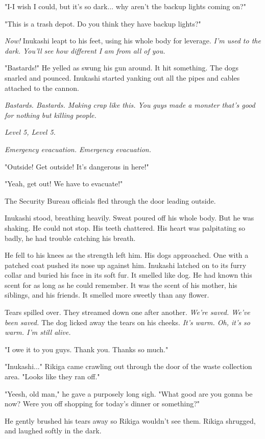 "I-I wish I could, but it's so dark... why aren't the backup lights
coming on?"

"This is a trash depot. Do you think they have backup lights?"

\emph{Now!} Inukashi leapt to his feet, using his whole body for leverage. \emph{I'm
used to the dark. You'll see how different I am from all of you.}

"Bastards!" He yelled as swung his gun around. It hit something. The
dogs snarled and pounced. Inukashi started yanking out all the pipes and
cables attached to the cannon.

\emph{Bastards. Bastards. Making crap like this. You guys made a monster
that's good for nothing but killing people.}

\emph{Level 5, Level 5.}

\emph{Emergency evacuation. Emergency evacuation.}

"Outside! Get outside! It's dangerous in here!"

"Yeah, get out! We have to evacuate!"

The Security Bureau officials fled through the door leading outside.

Inukashi stood, breathing heavily. Sweat poured off his whole body. But
he was shaking. He could not stop. His teeth chattered. His heart was
palpitating so badly, he had trouble catching his breath.

He fell to his knees as the strength left him. His dogs approached. One
with a patched coat pushed its nose up against him. Inukashi latched on
to its furry collar and buried his face in its soft fur. It smelled like
dog. He had known this scent for as long as he could remember. It was
the scent of his mother, his siblings, and his friends. It smelled more
sweetly than any flower.

Tears spilled over. They streamed down one after another. \emph{We're saved.
We've been saved.} The dog licked away the tears on his cheeks. \emph{It's
warm. Oh, it's so warm. I'm still alive.}

"I owe it to you guys. Thank you. Thanks so much."

"Inukashi..." Rikiga came crawling out through the door of the waste
collection area. "Looks like they ran off."

"Yeesh, old man," he gave a purposely long sigh. "What good are you
gonna be now? Were you off shopping for today's dinner or something?"

He gently brushed his tears away so Rikiga wouldn't see them. Rikiga
shrugged, and laughed softly in the dark.

